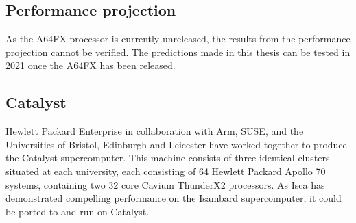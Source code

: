 \documentclass[a4paper,11pt]{report}
\begin{document}
\subsection{Performance projection}
As the A64FX processor is currently unreleased, the results from the performance projection cannot be verified. The predictions made in this thesis can be tested in 2021 once the A64FX has been released.

\subsection{Catalyst}
Hewlett Packard Enterprise in collaboration with Arm, SUSE, and the Universities of Bristol, Edinburgh and Leicester have worked together to produce the Catalyst supercomputer. This machine consists of three identical clusters situated at each university, each consisting of 64 Hewlett Packard Apollo 70 systems, containing two 32 core Cavium ThunderX2 processors. As Isca has demonstrated compelling performance on the Isambard supercomputer, it could be ported to and run on Catalyst. 
\end{document}
